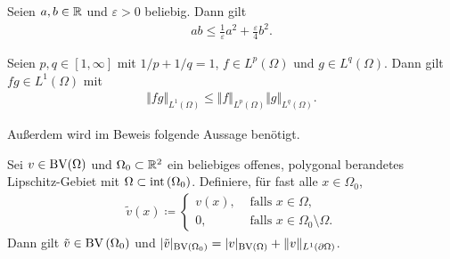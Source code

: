 \begin{lemma}
  \label{lem:young}
  Seien $a,b\in\mathbb{R}$ und $\varepsilon>0$ beliebig. Dann gilt
  \begin{align*}
    ab\leq\frac{1}{\varepsilon}a^2+\frac{\varepsilon}{4}b^2. 
  \end{align*}
\end{lemma}

\begin{lemma}
  \label{lem:hoelder}
  Seien $p,q\in [1,\infty]$ mit $1/p+1/q=1$, $f\in L^p(\Omega)$ und 
  $g\in L^q(\Omega)$. Dann gilt $fg\in L^1(\Omega)$ mit 
  \begin{align*}
    \Vert fg\Vert_{L^1(\Omega)}\leq 
    \Vert f\Vert_{L^p(\Omega)}\Vert g\Vert_{L^q(\Omega)}.
  \end{align*}
\end{lemma}


Außerdem wird im Beweis folgende Aussage benötigt.

\begin{lemma}
  \label{lem:bvExtension}
  Sei $v\in\textup{BV}(\Omega)$ und $\Omega_0\subset\mathbb{R}^2$ ein beliebiges offenes,
  polygonal berandetes 
  Lipschitz-Gebiet mit $\Omega\subset\operatorname{int}{\left(\Omega_0\right)}$.
  Definiere, für fast
  alle
  $x\in\Omega_0$,
  \begin{align*}
    \tilde{v}(x)\coloneqq
    \begin{cases}
      v(x),  &\text{ falls } x\in\Omega,\\
      0,     &\text{ falls } x\in\Omega_0\setminus\Omega.
    \end{cases} 
  \end{align*}
  Dann gilt $\tilde{v}\in\textup{BV}\left(\Omega_0\right)$ und
  $|\tilde{v}|_{\textup{BV}\left(\Omega_0\right)}
  = |v|_{\textup{BV}(\Omega)}+\Vert v\Vert_{L^1(\partial\Omega)}$.
\end{lemma}


